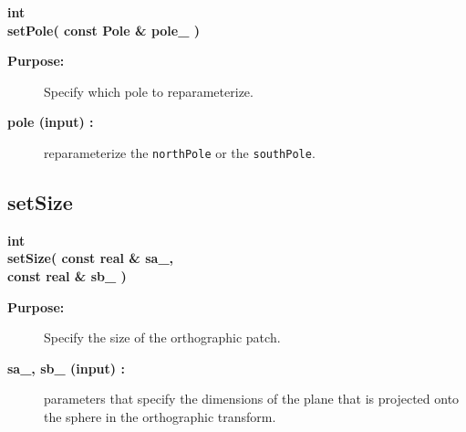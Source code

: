 \begin{flushleft} \textbf{%
int  \\ 
\settowidth{\OrthographicTransformIncludeArgIndent}{setPole(}%
setPole( const Pole \& pole\_ )
}\end{flushleft}
\begin{description}
\item[{\bf Purpose:}]  
    Specify which pole to reparameterize.
\item[{\bf pole (input) :}]  reparameterize the {\tt northPole} or the {\tt southPole}. 
\end{description}
\subsection{setSize}
 
\begin{flushleft} \textbf{%
int  \\ 
\settowidth{\OrthographicTransformIncludeArgIndent}{setSize(}%
setSize( const real \& sa\_, \\ 
\hspace{\OrthographicTransformIncludeArgIndent}const real \& sb\_ )
}\end{flushleft}
\begin{description}
\item[{\bf Purpose:}]  
   Specify the size of the orthographic patch.
\item[{\bf sa\_, sb\_ (input) :}]  parameters that specify the dimensions of the plane that is projected
   onto the sphere in the orthographic transform.
\end{description}
